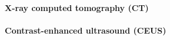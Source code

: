 \paragraph{X-ray computed tomography (CT)}
\label{sec:IntroCT}

\paragraph{Contrast-enhanced ultrasound (CEUS)}
\label{sec:IntroCEUS}

\newpage

